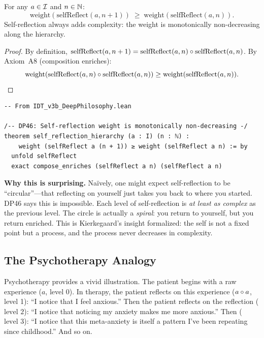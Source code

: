 \begin{theorem}
\label{thm:self-reflection-hierarchy}
For any $a \in \mathcal{I}$ and $n \in \mathbb{N}$:
\[
\mathrm{weight}(\mathrm{selfReflect}(a, n+1))
\;\geq\; \mathrm{weight}(\mathrm{selfReflect}(a, n)).
\]
Self-reflection always adds complexity: the weight is monotonically
non-decreasing along the hierarchy.
\end{theorem}

\begin{proof}
By definition, $\mathrm{selfReflect}(a, n+1) = \mathrm{selfReflect}(a, n)
\circ \mathrm{selfReflect}(a, n)$.  By Axiom~A8 (composition enriches):
\[
\mathrm{weight}(\mathrm{selfReflect}(a, n) \circ
\mathrm{selfReflect}(a, n)) \geq \mathrm{weight}(\mathrm{selfReflect}(a, n)).
\]
\end{proof}

\begin{lstlisting}
-- From IDT_v3b_DeepPhilosophy.lean

/-- DP46: Self-reflection weight is monotonically non-decreasing -/
theorem self_reflection_hierarchy (a : I) (n : ℕ) :
    weight (selfReflect a (n + 1)) ≥ weight (selfReflect a n) := by
  unfold selfReflect
  exact compose_enriches (selfReflect a n) (selfReflect a n)
\end{lstlisting}

\begin{surprisebox}
\noindent\textbf{Why this is surprising.}
Na\"ively, one might expect self-reflection to be ``circular''---that reflecting
on yourself just takes you back to where you started.  DP46 says this is
impossible.  Each level of self-reflection is \emph{at least as complex} as
the previous level.  The circle is actually a \emph{spiral}: you return to
yourself, but you return enriched.  This is Kierkegaard's insight formalized:
the self is not a fixed point but a process, and the process never decreases in
complexity.
\end{surprisebox}

\subsection{The Psychotherapy Analogy}

Psychotherapy provides a vivid illustration.  The patient begins with a raw
experience ($a$, level 0).  In therapy, the patient reflects on this
experience ($a \circ a$, level 1): ``I notice that I feel anxious.''  Then
the patient reflects on the reflection ($\text{level 2}$): ``I notice that
noticing my anxiety makes me more anxious.''  Then ($\text{level 3}$): ``I
notice that this meta-anxiety is itself a pattern I've been repeating since
childhood.''  And so on.

